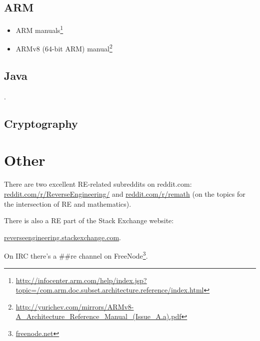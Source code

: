 \section{ARM}

\begin{itemize}
\item ARM manuals\footnote{\AlsoAvailableAs \url{http://infocenter.arm.com/help/index.jsp?topic=/com.arm.doc.subset.architecture.reference/index.html}}

\item ARMv8 (64-bit ARM) manual\footnote{\AlsoAvailableAs \url{http://yurichev.com/mirrors/ARMv8-A_Architecture_Reference_Manual_(Issue_A.a).pdf}}
\end{itemize}

\section{Java}

\Javabook.

\section{Cryptography}



\chapter{Other}

There are two excellent \ac{RE}-related subreddits on reddit.com:
\href{http://go.yurichev.com/17027}{reddit.com/r/ReverseEngineering/} and
\href{http://go.yurichev.com/17028}{reddit.com/r/remath}
(on the topics for the intersection of \ac{RE} and mathematics).

There is also a \ac{RE} part of the Stack Exchange website:

\par \href{http://go.yurichev.com/17029}{reverseengineering.stackexchange.com}.

On IRC there's a \#\#re channel on
FreeNode\footnote{\href{http://go.yurichev.com/17030}{freenode.net}}.

